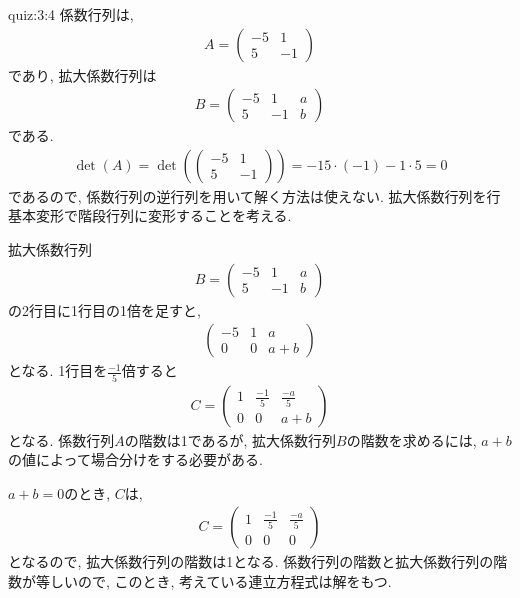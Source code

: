 \begin{answerof}{quiz:3:4}
  係数行列は,
  \begin{align*}
    A=\begin{pmatrix}-5&1\\5&-1\end{pmatrix}
  \end{align*}
  であり,
  拡大係数行列は
  \begin{align*}
    B=\begin{pmatrix}-5&1&a\\5&-1&b\end{pmatrix}
  \end{align*}
  である.
  \begin{align*}
    \det(A)=\det(\begin{pmatrix}-5&1\\5&-1\end{pmatrix})=-15\cdot(-1)-1\cdot 5 =0
  \end{align*}
  であるので, 係数行列の逆行列を用いて解く方法は使えない.
  拡大係数行列を行基本変形で階段行列に変形することを考える.


  拡大係数行列
  \begin{align*}
    B=\begin{pmatrix}-5&1&a\\5&-1&b\end{pmatrix}
  \end{align*}
  の2行目に1行目の1倍を足すと,
  \begin{align*}
    \begin{pmatrix}-5&1&a\\0&0&a+b\end{pmatrix}
  \end{align*}
  となる. 1行目を$\frac{-1}{5}$倍すると
  \begin{align*}
    C=\begin{pmatrix}1&\frac{-1}{5}&\frac{-a}{5}\\0&0&a+b\end{pmatrix}
  \end{align*}
  となる.
  係数行列$A$の階数は1であるが,
  拡大係数行列$B$の階数を求めるには,
  $a+b$の値によって場合分けをする必要がある.

  $a+b=0$のとき,
  $C$は,
  \begin{align*}
    C=\begin{pmatrix}1&\frac{-1}{5}&\frac{-a}{5}\\0&0&0\end{pmatrix}
  \end{align*}
  となるので, 拡大係数行列の階数は1となる.
  係数行列の階数と拡大係数行列の階数が等しいので,
  このとき, 考えている連立方程式は解をもつ.


\end{answerof}

